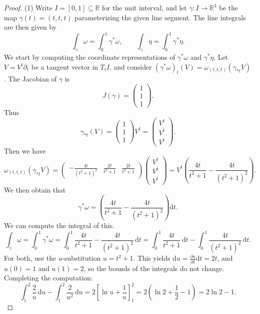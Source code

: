 \documentclass[11pt, letterpaper]{article}
\begin{document}
\begin{proof}
	(1) Write $I=[0,1]\subseteq \mathbb{R} $ for the unit interval, and let $\gamma : I \to \mathbb{R} ^3$ be the map $\gamma (t)=(t,t,t)$ parameterizing the given line segment. The line integrals are then given by
	\[
		\int_\gamma \omega =\int_0^1 \gamma ^*\omega,\qquad \int_\gamma \eta =\int_0^1 \gamma ^*\eta 
	.\]
	We start by computing the coordinate representations of $\gamma ^*\omega $ and $\gamma ^*\eta $. Let $V=V^t \partial_t$ be a tangent vector in $T_tI$, and consider $(\gamma ^*\omega )_t(V)=\omega_{(t,t,t)} (\gamma _{*t} V)$. The Jacobian of $\gamma $ is
	\[
		J(\gamma )=\begin{pmatrix}
		1 \\
		1 \\
		1
		\end{pmatrix}
	.\]
Thus
\[
	\gamma_{*t} (V)=\begin{pmatrix}
	1 \\
	1 \\
	1
	\end{pmatrix}V^t = \begin{pmatrix}
	V^t \\
	V^t \\
	V^t
	\end{pmatrix}
.\]
Then we have
\[
	\omega _{(t,t,t)} (\gamma_{*t} V)=\begin{pmatrix}
		\displaystyle{-\frac{4t}{\left( t^2+1 \right) ^2} } & \displaystyle{\frac{2t}{t^2+1} } & \displaystyle{\frac{2t}{t^2+1} }
	\end{pmatrix}\begin{pmatrix}
	V^t \\
	V^t \\
	V^t
	\end{pmatrix}=V^t \left( \frac{4t}{t^2+1} -\frac{4t}{\left( t^2+1 \right) ^2}  \right) 
.\]
We then obtain that
\[
	\gamma ^*\omega =\left( \frac{4t}{t^2+1} -\frac{4t}{\left( t^2+1 \right) ^2}  \right) \mathrm{d} t
.\]
We can compute the integral of this.
\[
	\int_\gamma \omega =\int_0^1 \gamma ^*\omega =\int_0^1 \frac{4t}{t^2+1} -\frac{4t}{\left( t^2+1 \right) ^2}  \,\mathrm{d} t=\int_0^1 \frac{4t}{t^2+1}  \,\mathrm{d} t-\int_{0}^{1} \frac{4t}{\left( t^2+1 \right) ^2}  \,\mathrm{d} t
.\]
For both, use the $u$-substitution $u=t^2+1$. This yields $\mathrm{d} u = \frac{\partial u}{\partial t} \mathrm{d} t = 2t$, and $u(0)=1$ and $u(1)=2$, so the bounds of the integrals do not change. Completing the computation:
\[
	\int_{1}^{2} \frac{2}{u}  \,\mathrm{d} u - \int_{1}^{2} \frac{2}{u^2}  \,\mathrm{d} u=2\left[ \ln u + \frac{1}{u}  \right]_1^2=2\left( \ln 2 + \frac{1}{2} -1 \right) =2 \ln 2 - 1
.\]


\end{proof}
\end{document}
